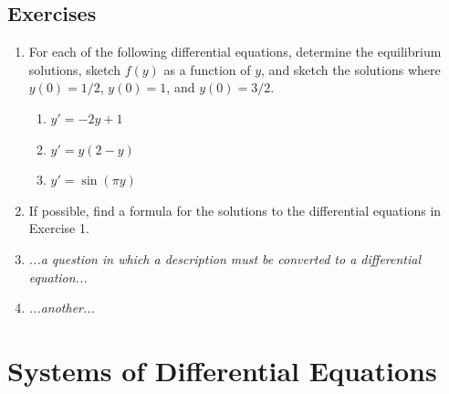 \documentclass[reqno]{immbook}
\newcommand{\ds}{\displaystyle}
\begin{document}
\subsection*{Exercises}
\begin{enumerate}
\item For each of the following differential equations,
determine the equilibrium solutions, sketch $f(y)$ as a function
of $y$, and sketch the solutions where $y(0)=1/2$, $y(0)=1$, and
$y(0)=3/2$.
\begin{enumerate}
\item $\ds y' = -2y + 1$
\item $\ds y' = y(2-y)$
\item $\ds y' = \sin(\pi y)$
\end{enumerate}
\item
If possible, find a formula for the solutions to the
differential equations in Exercise 1.
\item
\emph{...a question in which a description must be converted to
a differential equation...}
\item
\emph{...another...}
\end{enumerate}

\section{Systems of Differential Equations}
\end{document}
